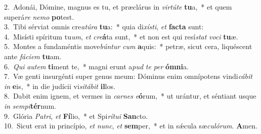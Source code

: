 {2.~}Adonái, Dómine, magnus es tu, et præclárus in \textit{vir}\textit{tú}\textit{te} \textbf{tu}a,~* et quem superá\textit{re} \textit{ne}\textit{mo} \textbf{po}test.\\
{3.~}Tibi sérviat omnis cre\textit{a}\textit{tú}\textit{ra} \textbf{tu}a:~* quia di\textit{xí}\textit{sti}, \textit{et} \textbf{fa}\textbf{cta} sunt:\\
{4.~}Misísti spíritum tu\textit{um}, \textit{et} \textit{cre}\textbf{á}ta sunt,~* et non est qui resí\textit{stat} \textit{vo}\textit{ci} \textbf{tu}æ.\\
{5.~}Montes a fundaméntis move\textit{bún}\textit{tur} \textit{cum} \textbf{a}quis:~* petræ, sicut cera, liquéscent ante \textit{fá}\textit{ci}\textit{em} \textbf{tu}am.\\
{6.~}\textit{Qui} \textit{au}\textit{tem} \textbf{ti}ment te,~* magni erunt a\textit{pud} \textit{te} \textit{per} \textbf{óm}\textbf{ni}a.\\
{7.~}Væ genti insurgénti super genus meum: Dóminus enim omnípotens vindi\textit{cá}\textit{bit} \textit{in} \textbf{e}is,~* in die judícii vi\textit{si}\textit{tá}\textit{bit} \textbf{il}los.\\
{8.~}Dabit enim ignem, et vermes in \textit{car}\textit{nes} \textit{e}\textbf{ó}rum,~* ut urántur, et séntiant usque \textit{in} \textit{sem}\textit{pi}\textbf{tér}num.\\
{9.~}Glória \textit{Pa}\textit{tri}, \textit{et} \textbf{Fí}lio,~* et Spi\textit{rí}\textit{tu}\textit{i} \textbf{San}cto.\\
{10.~}Sicut erat in princípio, \textit{et} \textit{nunc}, \textit{et} \textbf{sem}per,~* et in sǽcula sæ\textit{cu}\textit{ló}\textit{rum}. \textbf{A}men.\\
